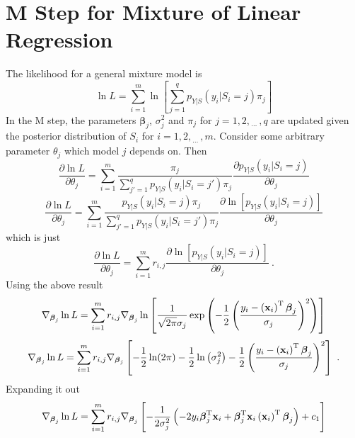 \documentclass[12pt]{report}
\newcommand{\T}{^\textup{T}}
\newcommand{\dotdotdot}{_{\phantom{.}\cdots}}
\newcommand{\vect}[1]{\mathbf{#1}}
\newcommand{\vectGreek}[1]{\boldsymbol{#1}}
\begin{document}
\section{M Step for Mixture of Linear Regression} \label{section:Mstep}
The likelihood for a general mixture model is
\begin{equation*}
\ln{L}=\sum_{i=1}^m\ln\left[
\sum_{j=1}^qp_{Y|S}\left(y_i|S_i=j\right)\pi_j
\right]
\end{equation*}
In the M step, the parameters $\vectGreek{\beta}_j$, $\sigma_j^2$ and $\pi_j$ for $j=1,2,\dotdotdot,q$ are updated given the posterior distribution of $S_i$ for $i=1,2,\dotdotdot,m$. Consider some arbitrary parameter $\theta_j$ which model $j$ depends on. Then
\begin{equation*}
\frac{\partial\ln{L}}{\partial\theta_j}=
\sum_{i=1}^m\frac{\pi_j}{\sum_{j'=1}^qp_{Y|S}\left(y_i|S_i=j'\right)\pi_j}
\frac{\partial p_{Y|S}\left(y_i|S_i=j\right)}{\partial\theta_j}
\end{equation*}
\begin{equation*}
\frac{\partial\ln{L}}{\partial\theta_j}=
\sum_{i=1}^m\frac{p_{Y|S}\left(y_i|S_i=j\right)\pi_j}{\sum_{j'=1}^qp_{Y|S}\left(y_i|S_i=j'\right)\pi_j}
\frac{\partial \ln\left[p_{Y|S}\left(y_i|S_i=j\right)\right]}{\partial\theta_j}
\end{equation*}
which is just
\begin{equation}
\frac{\partial\ln{L}}{\partial\theta_j}=
\sum_{i=1}^mr_{i,j}
\frac{\partial \ln\left[p_{Y|S}\left(y_i|S_i=j\right)\right]}{\partial\theta_j} \ .
\end{equation}
Using the above result
\begin{equation*}
\nabla_{\vectGreek{\beta}_j}\ln{L}
=\sum_{i=1}^{m}
r_{i,j}
\nabla_{\vectGreek{\beta}_j}
\ln\left[
	\frac{1}{\sqrt{2\pi}\sigma_j}\exp\left(-\frac{1}{2}\left(\frac{y_i-\left(\vect{x}_i\right)\T\vectGreek{\beta}_j}{\sigma_j}\right)^2\right)
\right]
\end{equation*}
\begin{equation*}
\nabla_{\vectGreek{\beta}_j}\ln{L}
=\sum_{i=1}^{m}
r_{i,j}
\nabla_{\vectGreek{\beta}_j}
\left[
	-\frac{1}{2}\ln(2\pi) - \frac{1}{2}\ln\left(\sigma_j^2\right)-\frac{1}{2}\left(\frac{y_i-\left(\vect{x}_i\right)\T\vectGreek{\beta}_j}{\sigma_j}\right)^2
\right] \ .
\end{equation*}
Expanding it out
\begin{equation*}
\nabla_{\vectGreek{\beta}_j}\ln{L}
=\sum_{i=1}^{m}
r_{i,j}
\nabla_{\vectGreek{\beta}_j}
\left[-\frac{1}{2\sigma_j^2}\left(-2y_i\vectGreek{\beta}_j\T\vect{x}_i
+\vectGreek{\beta}_j\T\vect{x}_i\left(\vect{x}_i\right)\T\vectGreek{\beta}_j
\right)
+c_1
\right]
\end{equation*}
\end{document}
